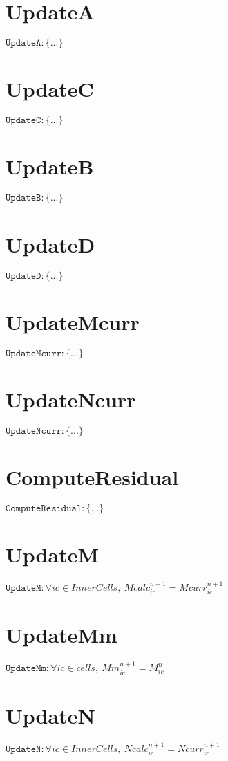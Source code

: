\documentclass[11pt]{article}
\begin{document}
\section{UpdateA}
$\texttt{UpdateA} : \{ ... \}$


\section{UpdateC}
$\texttt{UpdateC} : \{ ... \}$


\section{UpdateB}
$\texttt{UpdateB} : \{ ... \}$


\section{UpdateD}
$\texttt{UpdateD} : \{ ... \}$


\section{UpdateMcurr}
$\texttt{UpdateMcurr} : \{ ... \}$


\section{UpdateNcurr}
$\texttt{UpdateNcurr} : \{ ... \}$


\section{ComputeResidual}
$\texttt{ComputeResidual} : \{ ... \}$


\section{UpdateM}
$\texttt{UpdateM} : \forall{ic\in InnerCells}, \ Mcalc^{n+1}_{ic} = Mcurr^{n+1}_{ic}$


\section{UpdateMm}
$\texttt{UpdateMm} : \forall{ic\in cells}, \ Mm^{n+1}_{ic} = M^{n}_{ic}$


\section{UpdateN}
$\texttt{UpdateN} : \forall{ic\in InnerCells}, \ Ncalc^{n+1}_{ic} = Ncurr^{n+1}_{ic}$
\end{document}
